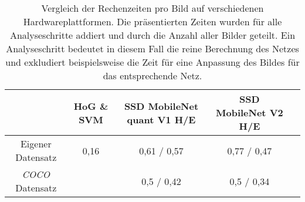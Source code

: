 \begin{table}[H]
	\caption{Vergleich der Rechenzeiten pro Bild auf verschiedenen Hardwareplattformen. Die präsentierten Zeiten wurden für alle Analyseschritte addiert und durch die Anzahl aller Bilder geteilt. Ein Analyseschritt bedeutet in diesem Fall die reine Berechnung des Netzes und exkludiert beispielsweise die Zeit für eine Anpassung des Bildes für das entsprechende Netz.  }
	\begin{center}
		\begin{tabular}{|c|c|c|c|c|}
			\hline
			\multicolumn{1}{|c|}{} & \multicolumn{1}{c|}{HoG \& SVM} & \multicolumn{1}{c|}{SSD MobileNet quant V1 H/E} & \multicolumn{1}{c|}{SSD MobileNet V2 H/E} \\ \hline 
			Eigener Datensatz	&0,16 	&0,61 / 0,57		& 0,77 / 0,47	 \\
			\textit{COCO} Datensatz	& 	&0,5 / 0,42		&  0,5 / 0,34	 \\
			
			\hline
		\end{tabular}
	\end{center}

	\label{fig: genauigkeiten}
\end{table}